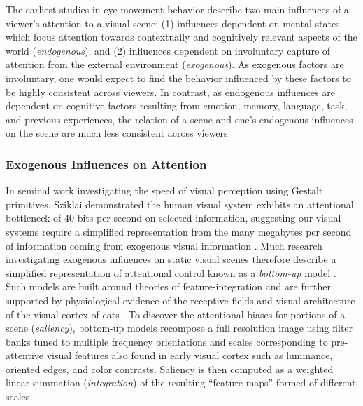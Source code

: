 The earliest studies in eye-movement behavior \cite{Buswell1935,Yarbus1967} describe two main influences of a viewer's attention to a visual scene: (1) influences dependent on mental states which focus attention towards contextually and cognitively relevant aspects of the world (\textit{endogenous}), and (2) influences dependent on involuntary capture of attention from the external environment (\textit{exogenous}).  As exogenous factors are involuntary, one would expect to find the behavior influenced by these factors to be highly consistent across viewers.  In contrast, as endogenous influences are dependent on cognitive factors resulting from emotion, memory, language, task, and previous experiences, the relation of a scene and one's endogenous influences on the scene are much less consistent across viewers.  

\subsubsection{Exogenous Influences on Attention}

In seminal work investigating the speed of visual perception using Gestalt primitives, Sziklai demonstrated the human visual system exhibits an attentional bottleneck of 40 bits per second on selected information, suggesting our visual systems require a simplified representation from the many megabytes per second of information coming from exogenous visual information \cite{Sziklai1956,Merrill1968}.  Much research investigating exogenous influences on static visual scenes therefore describe a simplified representation of attentional control known as a \textit{bottom-up} model \cite{Koch1985,Itti1998,Wolfe1989,Itti2001}.  Such models are built around theories of feature-integration \cite{Treisman1980} and are further supported by physiological evidence of the receptive fields and visual architecture of the visual cortex of cats \cite{Hubel1962}.  To discover the attentional biases for portions of a scene (\textit{saliency}), bottom-up models recompose a full resolution image using filter banks tuned to multiple frequency orientations and scales corresponding to pre-attentive visual features also found in early visual cortex such as luminance, oriented edges, and color contrasts.  Saliency is then computed as a weighted linear summation (\textit{integration}) of the resulting ``feature maps'' formed of different scales. 

